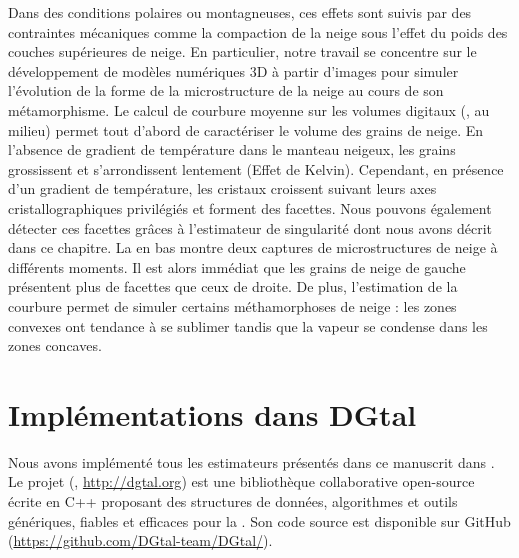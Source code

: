 Dans des conditions polaires ou montagneuses, ces effets sont suivis par des
contraintes mécaniques comme la compaction de la neige sous l'effet du poids des
couches supérieures de neige. En particulier, notre travail se concentre sur le
développement de modèles numériques 3D à partir d'images pour simuler
l'évolution de la forme de la microstructure de la neige au cours de son
métamorphisme. Le calcul de courbure moyenne sur les volumes digitaux
(, au milieu) permet tout d'abord de
caractériser le volume des grains de neige. En l'absence de gradient de
température dans le manteau neigeux, les grains grossissent et s'arrondissent
lentement (Effet de Kelvin). Cependant, en présence d'un gradient de
température, les cristaux croissent suivant leurs axes cristallographiques
privilégiés et forment des facettes. Nous pouvons également détecter ces
facettes grâces à l'estimateur de singularité dont nous avons décrit dans ce
chapitre. La  en bas montre deux captures de
microstructures de neige à différents moments. Il est alors immédiat que les
grains de neige de gauche présentent plus de facettes que ceux de droite. De
plus, l'estimation de la courbure permet de simuler certains méthamorphoses de
neige : les zones convexes ont tendance à se sublimer tandis que la vapeur se
condense dans les zones concaves.

\section{Implémentations dans DGtal}%
\label{sec:applications:dgtal}
%
Nous avons implémenté tous les estimateurs présentés dans ce manuscrit dans
\DGtal \cite{DGtal}. Le projet \DGtal (,
\url{http://dgtal.org}) est une bibliothèque collaborative open-source écrite en
\textsc{C++} proposant des structures de données, algorithmes et outils
génériques, fiables et efficaces pour la \DigitalGeometry. Son code source est
disponible sur GitHub (\url{https://github.com/DGtal-team/DGtal/}).

